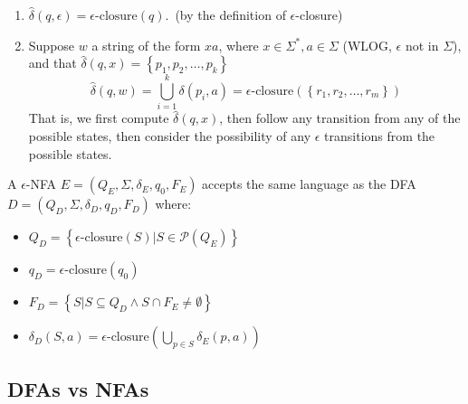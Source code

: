 \begin{enumerate}
  \item $\hat{\delta}\left( q,\epsilon \right) =\epsilon\text{-closure}\left(
    q \right)$.\ (by the definition of $\epsilon$-closure) \item Suppose $w$ a string of the form $xa$, where $x\in \Sigma^{*},a\in
    \Sigma$ (WLOG, $\epsilon$ not in $\Sigma$), and that $\hat{\delta}\left(
    q,x \right) =\left\{ p_1,p_2,\ldots,p_k \right\}$
    \[\hat{\delta}\left( q,w \right) =\bigcup_{i=1}^{k}\delta\left( p_i,a
    \right) =\epsilon\text{-closure}\left(   \left\{ r_1,r_2,\ldots,r_m \right\}\right)\]
    That is, we first compute $\hat{\delta}\left( q,x \right)$, then follow any
    transition from any of the possible states, then consider the possibility
    of any $\epsilon$ transitions from the possible states.
\end{enumerate}

\begin{remark}
  A $\epsilon$-NFA $E=(Q_E,\Sigma,\delta_E,q_0,F_E)$ accepts the same language
  as the DFA $D=\left( Q_D,\Sigma,\delta_D,q_D,F_D \right) $ where:
  \begin{itemize}
    \item $Q_D=\left\{ \epsilon\text{-closure}\left( S \right) | S\in
      \mathcal{P}(Q_E) \right\}$
    \item $q_D=\epsilon\text{-closure}\left( q_0 \right) $
    \item $F_D = \left\{ S| S\subseteq Q_D \wedge S\cap F_E\neq
      \emptyset\right\}$
    \item $\delta_D\left( S,a
  \right) =\epsilon\text{-closure}\left( \bigcup_{p\in S} \delta_E\left( p,a \right)  \right) $
  \end{itemize}
\end{remark}

\subsection{DFAs vs NFAs}

